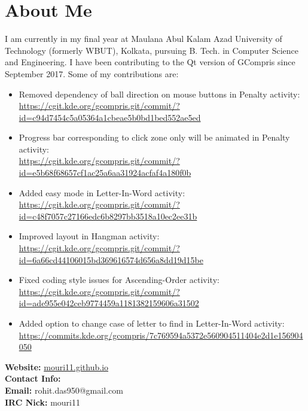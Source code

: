 \documentclass[preprint,12pt]{elsarticle}
\begin{document}
\section{About Me}
\label{S:1}
{I am currently in my final year at Maulana Abul Kalam Azad University of Technology (formerly WBUT), Kolkata, pursuing B. Tech. in Computer Science and Engineering. I have been contributing to the Qt version of GCompris since September 2017. Some of my contributions are:}
\begin{itemize}
\item {Removed dependency of ball direction on mouse buttons in Penalty activity:\\
\href{https://cgit.kde.org/gcompris.git/commit/?id=c94d7454c5a05364a1cbeae5b0bd1bed552ae5ed}{https://cgit.kde.org/gcompris.git/commit/?id=c94d7454c5a05364a1cbeae5b0bd1bed552ae5ed}}

\item {Progress bar corresponding to click zone only will be animated in Penalty activity:\\
 \href{https://cgit.kde.org/gcompris.git/commit/?id=e5b68f68657cf1ac25a6aa31924acfaf4a180f0b}{https://cgit.kde.org/gcompris.git/commit/?id=e5b68f68657cf1ac25a6aa31924acfaf4a180f0b}}

\item {Added easy mode in Letter-In-Word activity:\\
\href{https://cgit.kde.org/gcompris.git/commit/?id=c48f7057c27166edc6b8297bb3518a10ec2ee31b}{https://cgit.kde.org/gcompris.git/commit/?id=c48f7057c27166edc6b8297bb3518a10ec2ee31b}}

\item {Improved layout in Hangman activity:\\
\href{https://cgit.kde.org/gcompris.git/commit/?id=6a66cd44106015bd369616574d656a8dd19d15be}{https://cgit.kde.org/gcompris.git/commit/?id=6a66cd44106015bd369616574d656a8dd19d15be}}

\item {Fixed coding style issues for Ascending-Order activity:\\
\href{https://cgit.kde.org/gcompris.git/commit/?id=ade955e042ceb9774459a1181382159606a31502}{https://cgit.kde.org/gcompris.git/commit/?id=ade955e042ceb9774459a1181382159606a31502}}

\item {Added option to change case of letter to find in Letter-In-Word activity:\\
\href{https://commits.kde.org/gcompris/7c769594a5372e560904511404e2d1e156904050}{https://commits.kde.org/gcompris/7c769594a5372e560904511404e2d1e156904050}}
\end{itemize}
\bigskip
\textbf{Website: }\href{mouri11.github.io}{mouri11.github.io}\\
\textbf{Contact Info:}\\
\textbf{Email: }{rohit.das950@gmail.com}\\
\textbf{IRC Nick: } mouri11
\end{document}
